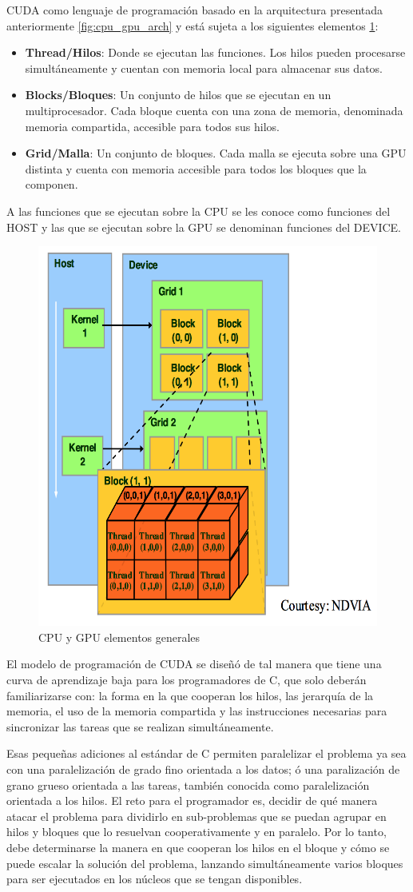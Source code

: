 CUDA como lenguaje de programación basado en la arquitectura presentada
anteriormente \ref{fig:cpu_gpu_arch} y está sujeta a los siguientes elementos
\ref{fig:cpu_gpu_elements}:
\begin{itemize}
 \item \textbf{Thread/Hilos}: Donde se ejecutan las funciones. Los hilos pueden
 procesarse simultáneamente y cuentan con memoria local para almacenar sus
 datos.
 \item \textbf{Blocks/Bloques}: Un conjunto de hilos que se ejecutan en un
 multiprocesador. Cada bloque cuenta con una zona de memoria, denominada
 memoria compartida, accesible para todos sus hilos.
 \item \textbf{Grid/Malla}:  Un conjunto de bloques. Cada malla se ejecuta sobre una
 GPU distinta y cuenta con memoria accesible para todos los bloques que la
 componen.
\end{itemize}

A las funciones que se ejecutan sobre la CPU se les conoce como funciones del 
HOST y las que se ejecutan sobre la GPU se denominan funciones del DEVICE.

\begin{figure}[h]
    \centering
    \includegraphics[height=0.5\textwidth]{images/elements.png}
    \caption{CPU y GPU elementos generales}
    \label{fig:cpu_gpu_elements}
\end{figure}

El modelo de programación de CUDA se diseñó de tal manera que tiene una curva
de aprendizaje baja para los programadores de C, que solo deberán
familiarizarse con: la forma en la que cooperan los hilos, las jerarquía de la
memoria, el uso de la memoria compartida y las instrucciones necesarias para
sincronizar las tareas que se realizan simultáneamente.

Esas pequeñas adiciones al estándar de C permiten paralelizar el problema ya
sea con una paralelización de grado fino orientada a los datos; ó una
paralización de grano grueso orientada a las tareas, también conocida como
paralelización orientada a los hilos. El reto para el programador es, decidir
de qué manera atacar el problema para dividirlo en sub-problemas que se puedan
agrupar en hilos y bloques que lo resuelvan cooperativamente y en paralelo.
Por lo tanto, debe determinarse la manera en que cooperan los hilos en el
bloque y cómo se puede escalar la solución del problema, lanzando
simultáneamente varios bloques para ser ejecutados en los núcleos que se tengan
disponibles.


